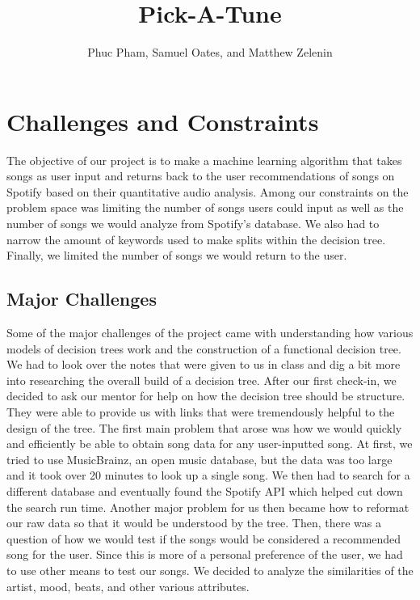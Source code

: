 \documentclass[]{report}
\title{Pick-A-Tune}
\author{Phuc Pham, Samuel Oates, and Matthew Zelenin}
\begin{document}
\maketitle
{}
\renewcommand\thesection{\Roman{section}}
\renewcommand\thesubsection{\thesection.\arabic{subsection}}

\section{Challenges and Constraints}
	The objective of our project is to make a machine learning algorithm that takes songs as user input and returns back to the user recommendations of songs on Spotify based on their quantitative audio analysis.  Among our constraints on the problem space was limiting the number of songs users could input as well as the number of songs we would analyze from Spotify's database. We also had to narrow the amount of keywords used to make splits within the decision tree. Finally, we limited the number of songs we would return to the user.
	\subsection{Major Challenges}
	Some of the major challenges of the project came with understanding how various models of decision trees work and the construction of a functional decision tree. We had to look over the notes that were given to us in class and dig a bit more into researching the overall build of a decision tree. After our first check-in, we decided to ask our mentor for help on how the decision tree should be structure. They were able to provide us with links that were tremendously helpful to the design of the tree.  The first main problem that arose was how we would quickly and efficiently be able to obtain song data for any user-inputted song. At first, we tried to use MusicBrainz, an open music database, but the data was too large and it took over 20 minutes to look up a single song. We then had to search for a different database and eventually found the Spotify API which helped cut down the search run time.  Another major problem for us then became how to reformat our raw data so that it would be understood by the tree.  Then, there was a question of how we would test if the songs would be considered a recommended song for the user. Since this is more of a personal preference of the user, we had to use other means to test our songs. We decided to analyze the similarities of the artist, mood, beats, and other various attributes.
\end{document}
